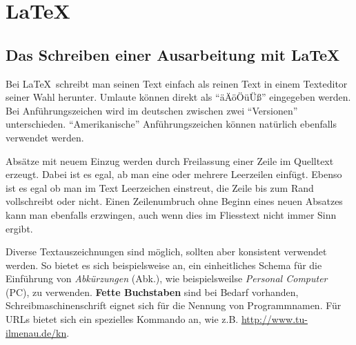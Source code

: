 %
%
%
%


\chapter{\LaTeX}
\section{Das Schreiben einer Ausarbeitung mit \LaTeX}
Bei \LaTeX\ schreibt man seinen Text einfach als reinen Text in einem
Texteditor seiner Wahl herunter. Umlaute können direkt als "`äÄöÖüÜß"'
eingegeben werden. Bei Anführungszeichen wird im deutschen zwischen
zwei "`Versionen"' unterschieden. ``Amerikanische'' Anführungszeichen
können natürlich ebenfalls verwendet werden.

Absätze mit neuem Einzug werden durch Freilassung einer Zeile im
Quelltext erzeugt. Dabei ist es egal, ab man eine oder mehrere Leerzeilen
einfügt. Ebenso  ist      es egal ob man             
    im Text Leerzeichen einstreut, die Zeile bis zum Rand vollschreibt
oder nicht. Einen Zeilenumbruch ohne Beginn eines neuen Absatzes
\\
kann man ebenfalls erzwingen, auch wenn dies im Fliesstext nicht immer Sinn ergibt.

Diverse Textauszeichnungen sind möglich, sollten aber konsistent verwendet werden.
So bietet es sich beispielsweise an, ein einheitliches Schema für die Einführung von
\emph{Abkürzungen} (Abk.), wie beispielsweilse \emph{Personal Computer} (PC),
zu verwenden. \textbf{Fette Buchstaben} sind bei Bedarf vorhanden,
{\ttfamily Schreibmaschinenschrift} eignet sich für die Nennung von
Programmnamen. Für URLs bietet sich ein spezielles Kommando an,
wie z.B. \url{http://www.tu-ilmenau.de/kn}.


